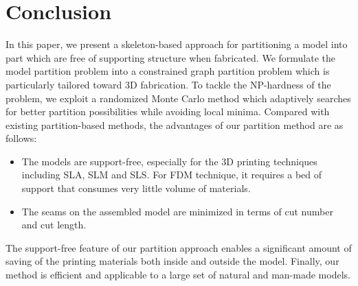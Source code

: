 \section{Conclusion}

In this paper, we present a skeleton-based approach for partitioning a model into part which are free of supporting structure when fabricated. We formulate the model partition problem into a constrained graph partition problem which is particularly tailored toward 3{D} fabrication. To tackle the NP-hardness of the problem, we exploit a randomized Monte Carlo method which adaptively searches for better partition possibilities while avoiding local minima. Compared with existing partition-based methods, the advantages of our partition method are as follows:

\begin{itemize}
 \item The models are support-free, especially for the 3D printing techniques including SLA, SLM and SLS. For FDM technique, it requires a bed of support that consumes very little volume of materials.
\item The seams on the assembled model are minimized in terms of cut number and cut length.
\end{itemize}

The support-free feature of our partition approach enables a significant amount of saving of the printing materials both inside and outside the model. Finally, our method is efficient and applicable to a large set of natural and man-made models.
